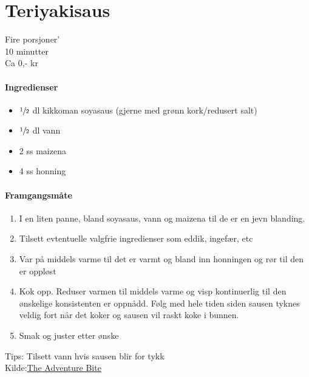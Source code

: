 \section{Teriyakisaus}
\label{teriyaki}

Fire porsjoner'\\
10 minutter\\
Ca 0,- kr

\paragraph{Ingredienser}
\begin{itemize}[noitemsep]
	\item $\sfrac{1}{2}$ dl kikkoman soyasaus (gjerne med grønn kork/redusert salt)
	\item $\sfrac{1}{2}$ dl vann
	\item 2 ss maizena
	\item 4 ss honning
\end{itemize}

\paragraph{Framgangsmåte}
\begin{enumerate}[noitemsep]
	\item I en liten panne, bland soyasaus, vann og maizena til de er en jevn blanding.
	\item Tilsett evtentuelle valgfrie ingredienser som eddik, ingefær, etc
  \item Var på middels varme til det er varmt og bland inn honningen og rør til den er oppløst
  \item Kok opp. Reduser varmen til middels varme og visp kontinuerlig til den ønskelige konsistenten er oppnådd. Følg med hele tiden siden sausen tyknes veldig fort når det koker og sausen vil raskt koke i bunnen.
  \item Smak og juster etter ønske

\end{enumerate}

Tips:  Tilsett vann hvis sausen blir for tykk\\

Kilde:\href{http://theadventurebite.com/3-ingredient-easy-teriyaki-sauce-recipe/}{The Adventure Bite}

